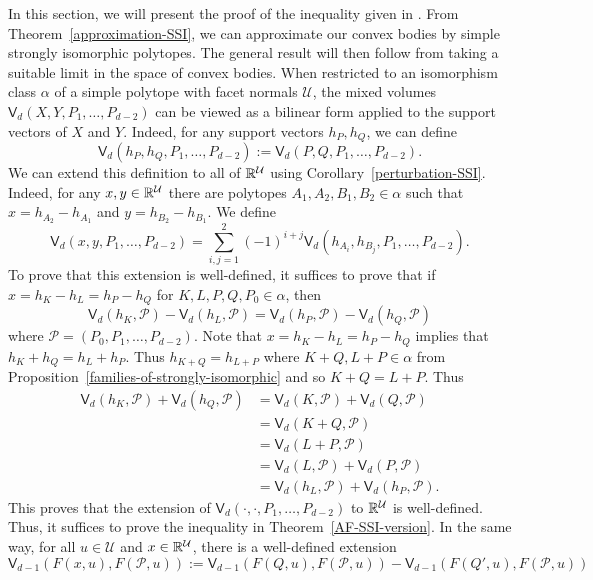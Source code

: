 \documentclass{puthesis-UG}
\begin{document}
In this section, we will present the proof of the inequality given in \cite{bochner}. From Theorem~\ref{approximation-SSI}, we can approximate our convex bodies by simple strongly isomorphic polytopes. The general result will then follow from taking a suitable limit in the space of convex bodies. When restricted to an isomorphism class $\alpha$ of a simple polytope with facet normals $\mathcal{U}$, the mixed volumes $\mathsf{V}_d (X, Y, P_1, \ldots, P_{d-2})$ can be viewed as a bilinear form applied to the support vectors of $X$ and $Y$. Indeed, for any support vectors $h_P, h_Q$, we can define 
\[
	\mathsf{V}_d (h_P, h_Q, P_1, \ldots, P_{d-2}) := \mathsf{V}_d (P, Q, P_1, \ldots, P_{d-2}).
\]
We can extend this definition to all of $\mathbb{R}^{\mathcal{U}}$ using Corollary~\ref{perturbation-SSI}. Indeed, for any $x, y \in \mathbb{R}^\mathcal{U}$ there are polytopes $A_1, A_2, B_1, B_2 \in \alpha$ such that $x = h_{A_2} - h_{A_1}$ and $y = h_{B_2} - h_{B_1}$. We define 
\[
	\mathsf{V}_d (x, y, P_1, \ldots, P_{d-2}) = \sum_{i, j = 1}^2 (-1)^{i+j}\mathsf{V}_d (h_{A_i}, h_{B_j}, P_1, \ldots, P_{d-2}).
\]
To prove that this extension is well-defined, it suffices to prove that if $x = h_K - h_L = h_P - h_Q$ for $K, L, P, Q, P_0 \in \alpha$, then 
\[
	\mathsf{V}_d (h_{K}, \mathcal{P}) - \mathsf{V}_d (h_{L}, \mathcal{P}) = \mathsf{V}_d (h_P,\mathcal{P}) - \mathsf{V}_d(h_Q, \mathcal{P})
\]
where $\mathcal{P} = (P_0, P_1, \ldots, P_{d-2})$. Note that $x = h_K - h_L = h_P - h_Q$ implies that $h_K + h_Q = h_L + h_P$. Thus $h_{K+Q} = h_{L+ P}$ where $K+Q, L+P \in \alpha$ from Proposition~\ref{families-of-strongly-isomorphic} and so $K + Q = L + P$. Thus
\begin{align*}
	\mathsf{V}_d(h_K, \mathcal{P}) + \mathsf{V}_d (h_Q, \mathcal{P}) & = \mathsf{V}_d (K, \mathcal{P}) + \mathsf{V}_d (Q, \mathcal{P}) \\
	& = \mathsf{V}_d (K + Q, \mathcal{P}) \\
	& = \mathsf{V}_d (L + P, \mathcal{P}) \\
	& = \mathsf{V}_d(L, \mathcal{P}) + \mathsf{V}_d (P, \mathcal{P}) \\
	& = \mathsf{V}_d(h_L, \mathcal{P}) + \mathsf{V}_d (h_P,\mathcal{P}).
\end{align*}
This proves that the extension of $\mathsf{V}_d (\cdot, \cdot, P_1, \ldots, P_{d-2})$ to $\mathbb{R}^{\mathcal{U}}$ is well-defined. Thus, it suffices to prove the inequality in Theorem~\ref{AF-SSI-version}. In the same way, for all $u \in \mathcal{U}$ and $x \in \mathbb{R}^\mathcal{U}$, there is a well-defined extension 
\[
	\mathsf{V}_{d-1} (F(x, u), F(\mathcal{P}, u)) := \mathsf{V}_{d-1}(F(Q, u), F(\mathcal{P}, u)) - \mathsf{V}_{d-1}(F(Q', u), F(\mathcal{P}, u))
\]
\end{document}
